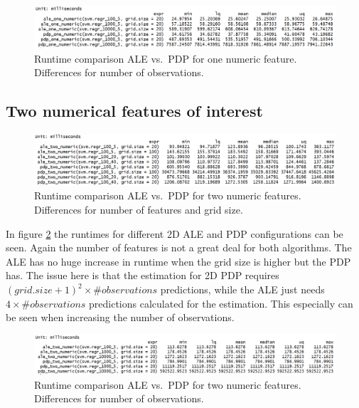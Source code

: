 \documentclass[
]{krantz}
\begin{document}
\begin{figure}
\includegraphics[width=1\linewidth]{images/ale_1_one_numeric_nrows} \caption{Runtime comparison ALE vs.~PDP for one numeric feature. Differences for number of observations.}\label{fig:runtime1DnumNrow}
\end{figure}



\hypertarget{two-numerical-features-of-interest}{%
\subsection{Two numerical features of interest}\label{two-numerical-features-of-interest}}

\begin{figure}
\includegraphics[width=1\linewidth]{images/ale_1_two_numeric_cols_and_gridsize} \caption{Runtime comparison ALE vs.~PDP for two numeric features. Differences for number of features and grid size.}\label{fig:runtime2DnumColAndSize}
\end{figure}



In figure \ref{fig:runtime2DnumColAndSize} the runtimes for different 2D ALE and PDP configurations can be seen. Again the number of features is not a great deal for both algorithms. The ALE has no huge increase in runtime when the grid size is higher but the PDP has. The issue here is that the estimation for 2D PDP requires \((grid.size + 1)^2 \times \#observations\) predictions, while the ALE just needs \(4 \times \#observations\) predictions calculated for the estimation. This especially can be seen when increasing the number of observations.

\begin{figure}
\includegraphics[width=1\linewidth]{images/ale_1_two_numeric_nrows} \caption{Runtime comparison ALE vs.~PDP for two numeric features. Differences for number of observations.}\label{fig:runtime2DnumNrow}
\end{figure}
\end{document}
